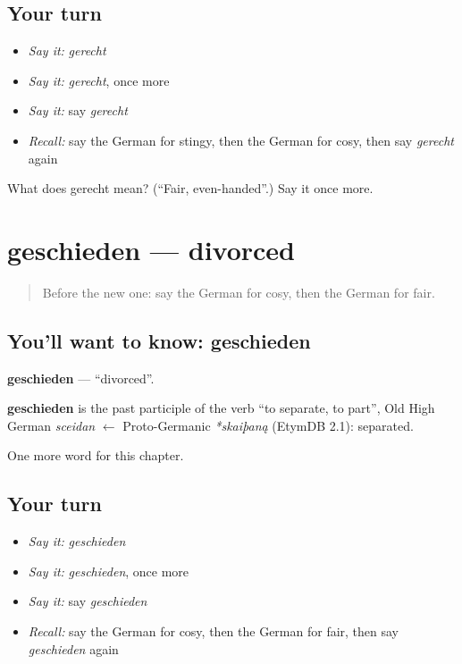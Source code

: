 \subsection*{Your turn}
\begin{itemize}
\raggedright
  \item \emph{Say it:} \emph{gerecht}
  \item \emph{Say it:} \emph{gerecht}, once more
  \item \emph{Say it:} say \emph{gerecht}
  \item \emph{Recall:} say the German for stingy, then the German for cosy, then say \emph{gerecht} again
\end{itemize}

\begin{tcolorbox}[breakable,colback=teal!4,colframe=teal!35!black,title={Before you move on}]
What does gerecht mean? (\textquotedblleft{}Fair, even-handed\textquotedblright{}.) Say it once more.
\end{tcolorbox}
\section[geschieden]{geschieden — divorced}

\label{lesson:GE-C215-geschieden}



\begin{quote}
Before the new one: say the German for cosy, then the German for fair.
\end{quote}

\subsection*{You'll want to know: geschieden}
\textbf{geschieden} — \textquotedblleft{}divorced\textquotedblright{}.

\begin{cousinweb}
\textbf{geschieden} is the past participle of the verb \textquotedblleft{}to separate, to part\textquotedblright{}, Old High German \emph{sceidan} $\leftarrow$ Proto-Germanic \emph{*skaiþaną} (EtymDB 2.1): separated.
\end{cousinweb}

\begin{grammarlens}[title={What you've built}]
One more word for this chapter.
\end{grammarlens}

\subsection*{Your turn}
\begin{itemize}
\raggedright
  \item \emph{Say it:} \emph{geschieden}
  \item \emph{Say it:} \emph{geschieden}, once more
  \item \emph{Say it:} say \emph{geschieden}
  \item \emph{Recall:} say the German for cosy, then the German for fair, then say \emph{geschieden} again
\end{itemize}

